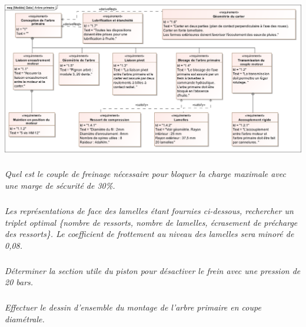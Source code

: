 \documentclass[10pt]{article}
\newif\ifprof
\begin{document}
\begin{center}
\includegraphics[width=\textwidth]{images/SysML/ArbrePrimaire.png}
\end{center}
%

\subparagraph{}
\textit{Quel est le couple de freinage nécessaire pour bloquer la charge maximale avec une marge de sécurité de 30\%.}

\ifprof
\else
\fi


\subparagraph{}
\textit{Les représentations de face des lamelles étant fournies ci-dessous, rechercher un triplet optimal \{nombre de ressorts, nombre de lamelles, écrasement de précharge des ressorts\}. Le coefficient de frottement au niveau des lamelles sera minoré de 0,08.}

\subparagraph{}
\textit{Déterminer la section utile du piston pour désactiver le frein avec une pression de 20 bars.}

\subparagraph{}
\textit{Effectuer le dessin d'ensemble du montage de l'arbre primaire en coupe diamétrale.}
\end{document}
